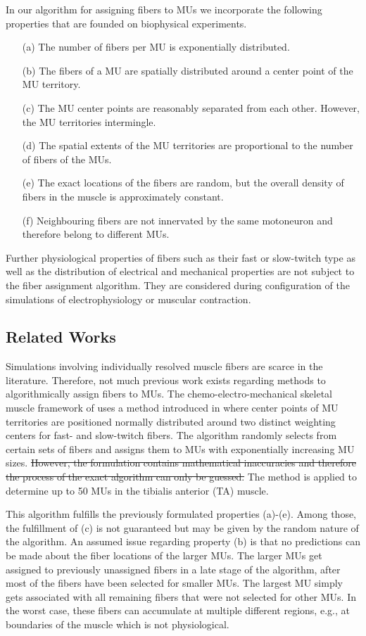 In our algorithm for assigning fibers to MUs we incorporate the following properties that are founded on biophysical experiments. 
\begin{itemize}
\item[(a)] The number of fibers per MU is  exponentially distributed. 
\item[(b)] The fibers of a MU are spatially distributed around a center point of the MU territory.
\item[(c)] The MU center points are reasonably separated from each other. However, the MU territories intermingle. 
\item[(d)] The spatial extents of the MU territories are proportional to the number of fibers of the MUs. 
\item[(e)] The exact locations of the fibers are random, but the overall density of fibers in the muscle is approximately constant. 
\item[(f)] Neighbouring fibers are not innervated by the same motoneuron and therefore belong to different MUs.
\end{itemize}

Further physiological properties of fibers such as their fast or slow-twitch type as well as the distribution of electrical and mechanical properties are not subject to the fiber assignment algorithm. They are considered during configuration of the simulations of electrophysiology or muscular contraction.

\subsection{Related Works}
Simulations involving individually resolved muscle fibers are scarce in the literature. Therefore, not much previous work exists regarding methods to algorithmically assign fibers to MUs. The chemo-electro-mechanical skeletal muscle framework of \cite{Heidlauf2013} uses a method introduced in \cite{Roehrle2012} where center points of MU territories are positioned normally distributed around two distinct weighting centers for fast- and slow-twitch fibers. 
The algorithm randomly selects from certain sets of fibers and assigns them to MUs with exponentially increasing MU sizes. \sout{However, the formulation contains mathematical inaccuracies and therefore the process of the exact algorithm can only be guessed.} The method is applied to determine up to 50 MUs in the tibialis anterior (TA) muscle.

This algorithm fulfills the previously formulated properties (a)-(e). Among those, the fulfillment of (c) is not guaranteed but may be given by the random nature of the algorithm. An assumed issue regarding property (b) is that no predictions can be made about the fiber locations of the larger MUs. The larger MUs get assigned to previously unassigned fibers in a late stage of the algorithm, after most of the fibers have been selected for smaller MUs. The largest MU simply gets associated with all remaining fibers that were not selected for other MUs. In the worst case, these fibers can accumulate at multiple different regions, e.g., at boundaries of the muscle which is not physiological.

